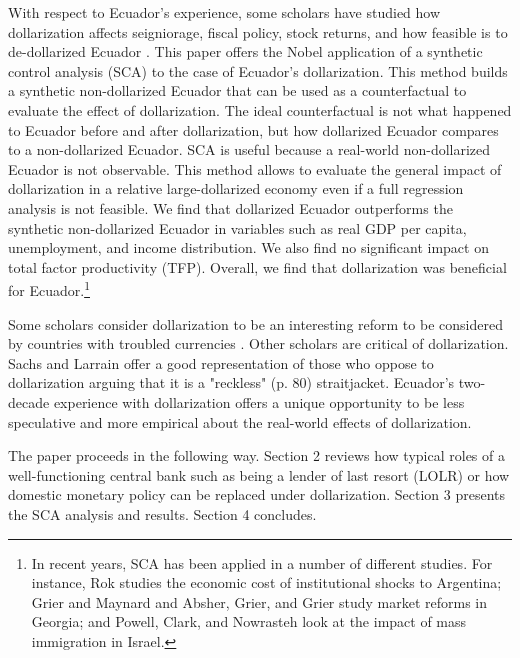 \documentclass[12pt]{article}
\begin{document}
With respect to Ecuador's experience, some scholars have studied how dollarization affects seigniorage, fiscal policy, stock returns, and how feasible is to de-dollarized Ecuador \parencite{Lange2005, Jansen2007, MariDelCristo2016, JAMESON2003}. This paper offers the Nobel application of a synthetic control analysis (SCA) \parencite{Abadie,Abadie2003,Abadie2015} to the case of Ecuador's dollarization. This method builds a synthetic non-dollarized Ecuador that can be used as a counterfactual to evaluate the effect of dollarization. The ideal counterfactual is not what happened to Ecuador before and after dollarization, but how dollarized Ecuador compares to a non-dollarized Ecuador. SCA is useful because a real-world non-dollarized Ecuador is not observable. This method allows to evaluate the general impact of dollarization in a relative large-dollarized economy even if a full regression analysis is not feasible. We find that dollarized Ecuador outperforms the synthetic non-dollarized Ecuador in variables such as real GDP per capita, unemployment, and income distribution. We also find no significant impact on total factor productivity (TFP). Overall, we find that dollarization was beneficial for Ecuador.\footnote{In recent years, SCA has been applied in a number of different studies. For instance, Rok \parencite*{Spruk2019} studies the economic cost of institutional shocks to Argentina; Grier and Maynard \parencite*{Grier2016} and Absher, Grier, and Grier \parencite*{Absher2020} study market reforms in Georgia; and Powell, Clark, and Nowrasteh \parencite*{Powell2017} look at the impact of mass immigration in Israel.}

Some scholars consider dollarization to be an interesting reform to be considered by countries with troubled currencies \parencite{Avila2019,Cochrane2018,Gale2002,Hanke2003a,White2014a,Alesina2001,Mendoza2001}. Other scholars are critical of dollarization. Sachs and Larrain \parencite*{Sachs1999} offer a good representation of those who oppose to dollarization arguing that it is a "reckless" (p. 80) straitjacket. Ecuador's two-decade experience with dollarization offers a unique opportunity to be less speculative and more empirical about the real-world effects of dollarization.

The paper proceeds in the following way. Section 2 reviews how typical roles of a well-functioning central bank such as being a lender of last resort (LOLR) or how domestic monetary policy can be replaced under dollarization. Section 3 presents the SCA analysis and results. Section 4 concludes.
\end{document}
